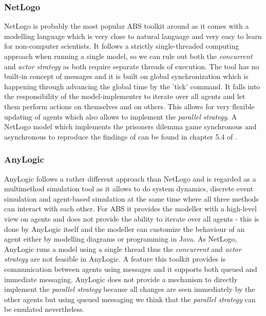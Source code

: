 \subsubsection{NetLogo}
NetLogo is probably the most popular ABS toolkit around as it comes with a modelling language which is very close to natural language and very easy to learn for non-computer scientists. It follows a strictly single-threaded computing approach when running a single model, so we can rule out both the \textit{concurrent} and \textit{actor strategy} as both require separate threads of execution. The tool has no built-in concept of messages and it is built on global synchronization which is happening through advancing the global time by the 'tick' command. It falls into the responsibility of the model-implementer to iterate over all agents and let them perform actions on themselves and on others. This allows for very flexible updating of agents which also allows to implement the \textit{parallel strategy}. A NetLogo model which implements the prisoners dilemma game synchronous and asynchronous to reproduce the findings of \cite{huberman_evolutionary_1993} can be found in chapter 5.4 of \cite{jansen_introduction_2012}.

\subsubsection{AnyLogic}
AnyLogic follows a rather different approach than NetLogo and is regarded as a multimethod simulation tool as it allows to do system dynamics, discrete event simulation and agent-based simulation at the same time where all three methods can interact with each other. For ABS it provides the modeller with a high-level view on agents and does not provide the ability to iterate over all agents - this is done by AnyLogic itself and the modeller can customize the behaviour of an agent either by modelling diagrams or programming in Java. As NetLogo, AnyLogic runs a model using a single thread thus the \textit{concurrent} and \textit{actor strategy} are not feasible in AnyLogic. A feature this toolkit provides is communication between agents using messages and it supports both queued and immediate messaging. AnyLogic does not provide a mechanism to directly implement the \textit{parallel strategy} because all changes are seen immediately by the other agents but using queued messaging we think that the \textit{parallel strategy} can be emulated nevertheless.
 
